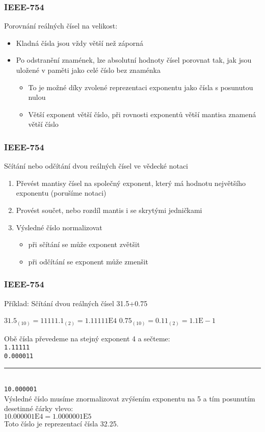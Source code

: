 \documentclass{beamer}
\begin{document}
\begin{frame}
\frametitle{IEEE-754 }

Porovnání reálných čísel na velikost:
\begin{itemize}
\item Kladná čísla jsou vždy větší než záporná
\item Po odstranění znamének, lze absolutní hodnoty čísel porovnat tak, jak jsou uložené v paměti jako celé číslo bez znaménka
\begin{itemize}
\item To je možné díky zvolené reprezentaci exponentu jako čísla s posunutou nulou
\item Větší exponent větší číslo, při rovnosti exponentů větší mantisa znamená větší číslo
\end{itemize}
\end{itemize}
\end{frame}


\begin{frame}
\frametitle{IEEE-754}

Sčítání nebo odčítání dvou reálných čísel ve vědecké notaci
\begin{enumerate}
\item Převést mantisy čísel na společný exponent, který má hodnotu největšího exponentu (porušíme notaci)
\item Provést součet, nebo rozdíl mantis i se skrytými jedničkami
\item Výsledné číslo normalizovat
\begin{itemize}
\item při sčítání se může exponent zvětšit
\item při odčítání se exponent může zmenšit
\end{itemize}
\end{enumerate}

\end{frame}


\begin{frame}
\frametitle{IEEE-754}

Příklad: Sčítání dvou reálných čísel 31.5+0.75

$31.5_{(10)} = 11111.1_{(2)} = 1.11111\text{E}4$ \phantom{xxx} $0.75_{(10)} = 0.11_{(2)} = 1.1\text{E}-1$

\bigskip
Obě čísla převedeme na stejný exponent 4 a sečteme:\\
\texttt{\phantom{xx}1.11111}\\
\texttt{\phantom{xx}0.000011}\vspace{-6pt}\\
\rule[0pt]{2cm}{0.4pt}\\
\texttt{\phantom{x}10.000001}\\

Výsledné číslo musíme znormalizovat zvýšením exponentu na 5 a tím posunutím desetinné čárky vlevo:\\
$10.000001\text{E}4 = 1.0000001\text{E}5$\\

Toto číslo je reprezentací čísla 32.25.

\end{frame}
\end{document}
